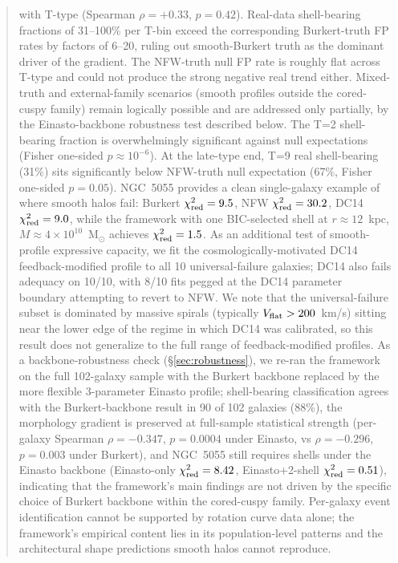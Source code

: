 \begin{abstract}
with T-type (Spearman $\rho = +0.33$, $p = 0.42$). Real-data shell-bearing fractions of 31--100\% per T-bin exceed the corresponding Burkert-truth FP rates by factors of 6--20, ruling out smooth-Burkert truth as the dominant driver of the gradient. The NFW-truth null FP rate is roughly flat across T-type and could not produce the strong negative real trend either. Mixed-truth and external-family scenarios (smooth profiles outside the cored-cuspy family) remain logically possible and are addressed only partially, by the Einasto-backbone robustness test described below. The T=2 shell-bearing fraction is overwhelmingly significant against null expectations (Fisher one-sided $p \approx 10^{-6}$). At the late-type end, T=9 real shell-bearing (31\%) sits significantly below NFW-truth null expectation (67\%, Fisher one-sided $p = 0.05$). NGC~5055 provides a clean single-galaxy example of where smooth halos fail: Burkert $\chi^2_{\rm red} = 9.5$, NFW $\chi^2_{\rm red} = 30.2$, DC14 $\chi^2_{\rm red} = 9.0$, while the framework with one BIC-selected shell at $r \approx 12$~kpc, $M \approx 4 \times 10^{10}$~M$_\odot$ achieves $\chi^2_{\rm red} = 1.5$. As an additional test of smooth-profile expressive capacity, we fit the cosmologically-motivated \citet{DiCintio2014a,DiCintio2014b} DC14 feedback-modified profile to all 10 universal-failure galaxies; DC14 also fails adequacy on 10/10, with 8/10 fits pegged at the DC14 parameter boundary attempting to revert to NFW. We note that the universal-failure subset is dominated by massive spirals (typically $V_{\rm flat} > 200$~km/s) sitting near the lower edge of the regime in which DC14 was calibrated, so this result does not generalize to the full range of feedback-modified profiles. As a backbone-robustness check (\S\ref{sec:robustness}), we re-ran the framework on the full 102-galaxy sample with the Burkert backbone replaced by the more flexible 3-parameter Einasto profile; shell-bearing classification agrees with the Burkert-backbone result in 90 of 102 galaxies (88\%), the morphology gradient is preserved at full-sample statistical strength (per-galaxy Spearman $\rho = -0.347$, $p = 0.0004$ under Einasto, vs $\rho = -0.296$, $p = 0.003$ under Burkert), and NGC~5055 still requires shells under the Einasto backbone (Einasto-only $\chi^2_{\rm red} = 8.42$, Einasto+2-shell $\chi^2_{\rm red} = 0.51$), indicating that the framework's main findings are not driven by the specific choice of Burkert backbone within the cored-cuspy family. Per-galaxy event identification cannot be supported by rotation curve data alone; the framework's empirical content lies in its population-level patterns and the architectural shape predictions smooth halos cannot reproduce.
\end{abstract}

